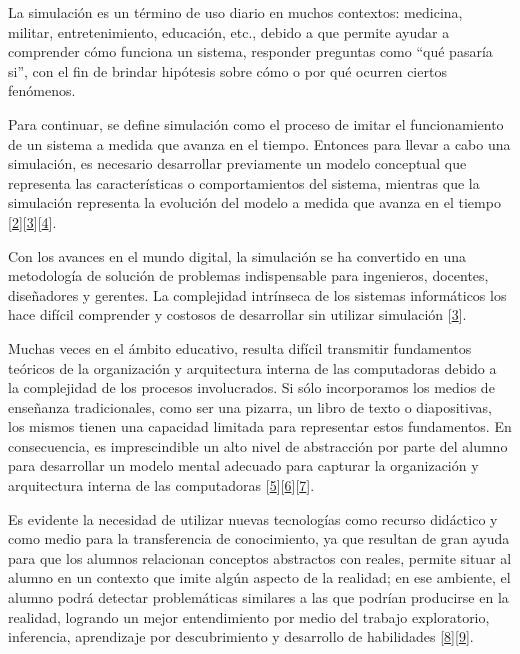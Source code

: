 \documentclass[12pt,twoside]{templates/unerthesis}
\begin{document}
La simulación es un término de uso diario en muchos contextos: medicina, militar, entretenimiento, educación, etc., debido a que permite ayudar a comprender cómo funciona un sistema, responder preguntas como ``qué pasaría si'', con el fin de brindar hipótesis sobre cómo o por qué ocurren ciertos fenómenos.

Para continuar, se define simulación como el proceso de imitar el funcionamiento de un sistema a medida que avanza en el tiempo. Entonces para llevar a cabo una simulación, es necesario desarrollar previamente un modelo conceptual que representa las características o comportamientos del sistema, mientras que la simulación representa la evolución del modelo a medida que avanza en el tiempo {[}\protect\hyperlink{ref-banks_discrete-event_2010}{2}{]}{[}\protect\hyperlink{ref-law_simulation_2015}{3}{]}{[}\protect\hyperlink{ref-robinson_simulation_2014}{4}{]}.

Con los avances en el mundo digital, la simulación se ha convertido en una metodología de solución de problemas indispensable para ingenieros, docentes, diseñadores y gerentes. La complejidad intrínseca de los sistemas informáticos los hace difícil comprender y costosos de desarrollar sin utilizar simulación {[}\protect\hyperlink{ref-law_simulation_2015}{3}{]}.

Muchas veces en el ámbito educativo, resulta difícil transmitir fundamentos teóricos de la organización y arquitectura interna de las computadoras debido a la complejidad de los procesos involucrados. Si sólo incorporamos los medios de enseñanza tradicionales, como ser una pizarra, un libro de texto o diapositivas, los mismos tienen una capacidad limitada para representar estos fundamentos. En consecuencia, es imprescindible un alto nivel de abstracción por parte del alumno para desarrollar un modelo mental adecuado para capturar la organización y arquitectura interna de las computadoras {[}\protect\hyperlink{ref-lion_simuladores_2005}{5}{]}{[}\protect\hyperlink{ref-contreras_uso_2010}{6}{]}{[}\protect\hyperlink{ref-garcia-garcia_pbbcache_2020}{7}{]}.

Es evidente la necesidad de utilizar nuevas tecnologías como recurso didáctico y como medio para la transferencia de conocimiento, ya que resultan de gran ayuda para que los alumnos relacionan conceptos abstractos con reales, permite situar al alumno en un contexto que imite algún aspecto de la realidad; en ese ambiente, el alumno podrá detectar problemáticas similares a las que podrían producirse en la realidad, logrando un mejor entendimiento por medio del trabajo exploratorio, inferencia, aprendizaje por descubrimiento y desarrollo de habilidades {[}\protect\hyperlink{ref-nova_tool_2013}{8}{]}{[}\protect\hyperlink{ref-mustafa_evaluating_2010}{9}{]}.
\end{document}
